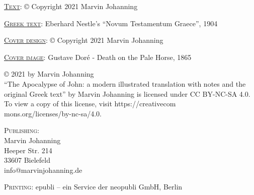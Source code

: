 \thispagestyle{empty}
\noindent\textsc{\underline{Text}}: © Copyright 2021 Marvin Johanning

\noindent\textsc{\underline{Greek text}}: Eberhard Nestle's ``Novum Testamentum Graece'', 1904

\noindent\textsc{\underline{Cover design}}: © Copyright 2021 Marvin Johanning

\noindent\textsc{\underline{Cover image}}: Gustave Doré - Death on the Pale Horse, 1865

\bigskip

\noindent© 2021 by Marvin Johanning\\``The Apocalypse of John: a modern illustrated translation with notes and the original Greek text'' by Marvin Johanning is licensed under CC BY-NC-SA 4.0. To view a copy of this license, visit https://creativecom\\mons.org/licenses/by-nc-sa/4.0.

\vspace{10mm}\noindent\textsc{Publishing}: \\
Marvin Johanning\\
Heeper Str.  214\\
33607 Bielefeld\\
info@marvinjohanning.de

\vspace{5mm}\noindent\textsc{Printing}: epubli – ein Service der neopubli GmbH, Berlin
\newpage